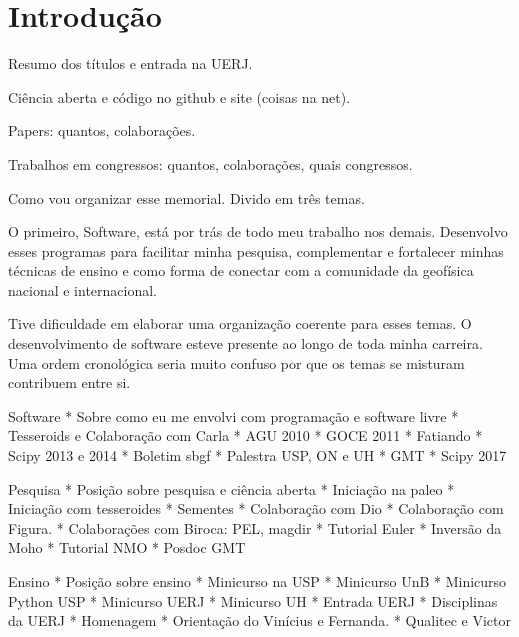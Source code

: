 \chapter{Introdução}

Resumo dos títulos e entrada na UERJ.

Ciência aberta e código no github e site (coisas na net).

Papers: quantos, colaborações.

Trabalhos em congressos: quantos, colaborações, quais congressos.

Como vou organizar esse memorial.
Divido em três temas.

O primeiro, Software, está por trás de todo meu trabalho nos demais.
Desenvolvo esses programas para facilitar minha pesquisa, complementar e
fortalecer minhas técnicas de ensino e como forma de conectar com a comunidade
da geofísica nacional e internacional.

Tive dificuldade em elaborar uma organização coerente para esses temas.
O desenvolvimento de software esteve presente ao longo de toda minha carreira.
Uma ordem cronológica seria muito confuso por que os temas se misturam contribuem entre si.

Software
* Sobre como eu me envolvi com programação e software livre
* Tesseroids e Colaboração com Carla
* AGU 2010
* GOCE 2011
* Fatiando
* Scipy 2013 e 2014
* Boletim sbgf
* Palestra USP, ON e UH
* GMT
* Scipy  2017

Pesquisa
* Posição sobre pesquisa e ciência aberta
* Iniciação na paleo
* Iniciação com tesseroides
* Sementes
* Colaboração com Dio
* Colaboração com Figura.
* Colaborações com Biroca: PEL, magdir
* Tutorial Euler
* Inversão da Moho
* Tutorial NMO
* Posdoc GMT

Ensino
* Posição sobre ensino
* Minicurso na USP
* Minicurso UnB
* Minicurso Python USP
* Minicurso UERJ
* Minicurso UH
* Entrada UERJ
* Disciplinas da UERJ
* Homenagem
* Orientação do Vinícius e Fernanda.
* Qualitec e Victor



